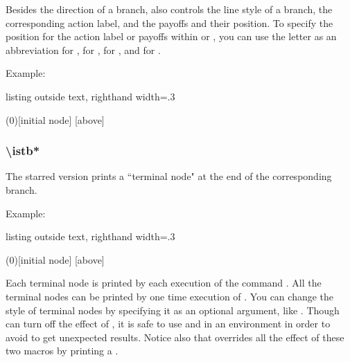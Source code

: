 Besides the direction of a branch,  \cmd{\istb} also controls the line style of a branch,
the corresponding action label, and the payoffs and their position.
To specify the position for the action label or payoffs within \cmd{\istb} or \cmd{\istb*}, 
you can use the letter  as an abbreviation for ,  for ,  for , and  for .

Example: 

\begin{tcblisting}{listing outside text, righthand width=.3\linewidth}
\begin{istgame}
\istroot[-45](0)[initial node]
  \istb
  [above]
\endist
\end{istgame}
\end{tcblisting}


\subsubsection*{\textbackslash istb*}

The starred version \cmd{\istb*} prints a ``terminal node" at the end of the corresponding branch. 
\vspace{-2pt}

Example: 

\begin{tcblisting}{listing outside text, righthand width=.3\linewidth}
\begin{istgame}
\istroot[-45](0)[initial node]
  \istb*
  [above]
\endist
\end{istgame}
\end{tcblisting}

Each terminal node is printed by each execution of the command \cmd{\istb*}.
All the terminal nodes can be printed by one time execution of \cmd{\xtShowTerminalNodes}.
You can change the style of terminal nodes by specifying it as an optional argument, like
.
Though \cmd{\xtHideTerminalNodes} can turn off the effect of \cmd{\xtShowTerminalNodes}, it is safe to use \cmd{\xtShowTerminalNodes} and \cmd{\xtHideTerminalNodes} in an  environment in order to avoid to get unexpected results.
Notice also that \cmd{\istb*} overrides all the effect of these two macros by printing a .

